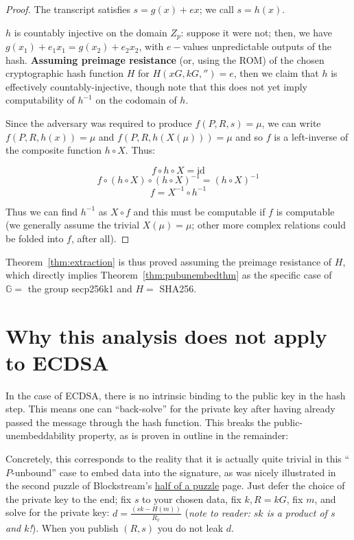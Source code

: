 \documentclass[10pt,a4paper]{article}
\theoremstyle{definition}   %
\theoremstyle{remark}       %
\newcommand{\G}{\mathbb{G}}
\begin{document}
\begin{proof}
The transcript satisfies $s=g(x)+ex$; we call $s = h(x)$.

$h$ is countably injective on the domain $Z_p$: suppose it were not; then, we have $g(x_1) + e_1x_1 = g(x_2) + e_2 x_2$, with $e-$values unpredictable outputs of the hash. \textbf{Assuming preimage resistance} (or, using the ROM) of the chosen cryptographic hash function $H$ for $H(xG, kG, '')=e$, then we claim that $h$ is effectively countably-injective, though note that this does not yet imply computability of $h^{-1}$ on the codomain of $h$.

\vskip 0.1in

Since the adversary was required to produce $f(P, R, s) =  \mu$, we can write $f(P, R, h(x)) = \mu$ and $f(P, R, h(X(\mu))) = \mu$ and so $f$ is a left-inverse of the composite function $h \circ X$. Thus:

\[ f \circ h \circ X = \textrm{id}
\]
\[ f \circ \left(h \circ X\right) \circ \left(h \circ X\right)^{-1} =  \left(h \circ X \right)^{-1}
\]
\[ f = X^{-1} \circ h^{-1}
\]

Thus we can find $h^{-1}$ as $X \circ f$ and this must be computable if $f$ is computable (we generally assume the trivial $X(\mu) = \mu$; other more complex relations could be folded into $f$, after all).
\end{proof}
\vskip 0.2in
Theorem~\ref{thm:extraction} is thus proved assuming the preimage resistance of $H$, which directly implies Theorem~\ref{thm:pubunembedthm} as the specific case of $\G =$ the group secp256k1 and $H =$ SHA256.




\section{Why this analysis does not apply to ECDSA}

In the case of ECDSA, there is no intrinsic binding to the public key in the hash step. This means one can ``back-solve'' for the private key after having already passed the message through the hash function. This breaks the public-unembeddability property, as is proven in outline in the remainder:

\vskip 0.2in

Concretely, this corresponds to the reality that it is actually quite trivial in this ``$P$-unbound'' case to embed data into the signature, as was nicely illustrated in the second puzzle of Blockstream's \href{https://blockstream.com/puzzle/}{half of a puzzle} page. Just defer the choice of the private key to the end; fix $s$ to your chosen data, fix $k, R=kG$, fix $m$, and solve for the private key: $d = \frac{(sk - H(m))}{R_x}$ (\emph{note to reader: $sk$ is a product of $s$ and $k$!}). When you publish $(R, s)$ you do not leak $d$.
\end{document}
